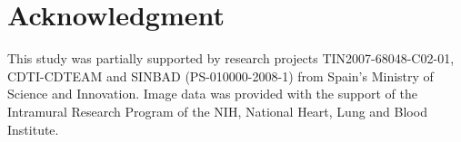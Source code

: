\documentclass{InsightArticle}
\begin{document}
\section*{Acknowledgment}

This study was partially supported by research projects  TIN2007-68048-C02-01, 
  CDTI-CDTEAM and SINBAD (PS-010000-2008-1) from Spain's Ministry of Science and Innovation.
Image data was provided with the support of the Intramural Research Program of the 
  NIH, National Heart, Lung and Blood Institute.



\end{document}
